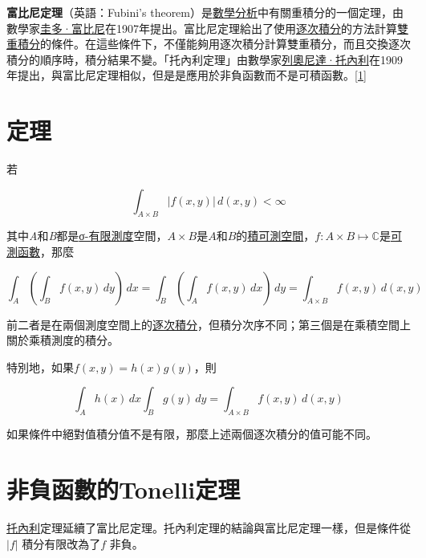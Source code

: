 \textbf{富比尼定理}（英語：Fubini's theorem）是\href{https://zh.wikipedia.org/wiki/数学分析}{數學分析}中有關重積分的一個定理，由數學家\href{https://zh.wikipedia.org/wiki/圭多·富比尼}{圭多·富比尼}在1907年提出。富比尼定理給出了使用\href{https://zh.wikipedia.org/wiki/逐次积分}{逐次積分}的方法計算\href{https://zh.wikipedia.org/wiki/双重积分}{雙重積分}的條件。在這些條件下，不僅能夠用逐次積分計算雙重積分，而且交換逐次積分的順序時，積分結果不變。「托內利定理」由數學家\href{https://zh.wikipedia.org/wiki/列奧尼達·托內利}{列奧尼達·托內利}在1909年提出，與富比尼定理相似，但是是應用於非負函數而不是可積函數。\href{https://zh.wikipedia.org/wiki/富比尼定理#cite_note-1}{[1]}

\section{定理}

若

\[
{\displaystyle \int _{A\times B}|f(x,y)|\,d(x,y)<\infty }
\]

其中\emph{A}和\emph{B}都是\href{https://zh.wikipedia.org/wiki/Σ-有限测度}{σ-有限測度}空間，\( {\displaystyle A\times B}\)是\(A\)和\(B\)的\href{https://zh.wikipedia.org/wiki/积测度}{積可測空間}，\({\displaystyle f:A\times B\mapsto \mathbb {C} }\)是\href{https://zh.wikipedia.org/wiki/可测函数}{可測函數}，那麼

\[
{\displaystyle \int _{A}\left(\int _{B}f(x,y)\,dy\right)\,dx=\int _{B}\left(\int _{A}f(x,y)\,dx\right)\,dy=\int _{A\times B}f(x,y)\,d(x,y)}
\]

前二者是在兩個測度空間上的\href{https://zh.wikipedia.org/wiki/逐次积分}{逐次積分}，但積分次序不同；第三個是在乘積空間上關於乘積測度的積分。

特別地，如果\({\displaystyle f(x,y)=h(x)g(y)}\)，則

\[
{\displaystyle \int _{A}h(x)\,dx\int _{B}g(y)\,dy=\int _{A\times B}f(x,y)\,d(x,y)}
\]

如果條件中絕對值積分值不是有限，那麼上述兩個逐次積分的值可能不同。

\section{非負函數的Tonelli定理}

\href{https://zh.wikipedia.org/wiki/列奧尼達·托內利}{托內利}定理延續了富比尼定理。托內利定理的結論與富比尼定理一樣，但是條件從 \({\displaystyle |f|}\) 積分有限改為了\({\displaystyle f}\) 非負。

